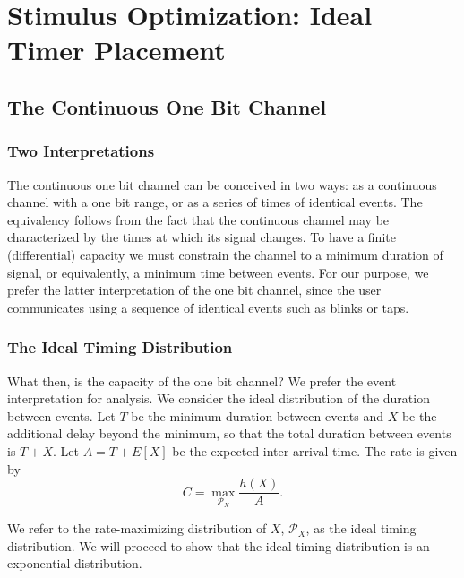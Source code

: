 \chapter{Stimulus Optimization: Ideal Timer Placement}
\label{chap:optimize-stimulus-parameters}

\section{The Continuous One Bit Channel}
\subsection{Two Interpretations}

The continuous one bit channel can be conceived in two ways: as a continuous channel
with a one bit range, or as a series of times of identical events. The equivalency follows
from the fact that the continuous channel may be characterized by the times at which
its signal changes. To have a finite (differential) capacity we must constrain the channel to a minimum duration of signal,
or equivalently, a minimum time between events. For our purpose, we prefer the latter interpretation of
the one bit channel, since the user communicates using a sequence of identical events such as blinks
or taps.

\subsection{The Ideal Timing Distribution}
What then, is the capacity of the one bit channel? We prefer the event interpretation for analysis.
We consider the ideal distribution of the duration between events.
Let $T$ be the minimum duration between events and $X$ be the additional delay beyond the minimum,
so that the total duration between events is $T + X$.
Let $A = T + E[X]$ be the expected inter-arrival time.
The rate is given by
$$C = \max_{\mathcal{P}_X} \frac{h(X)}{A}.$$

We refer to the rate-maximizing distribution of $X$, $\mathcal{P}_X$, as the ideal timing distribution.
We will proceed to show that the ideal timing distribution is an exponential distribution.

